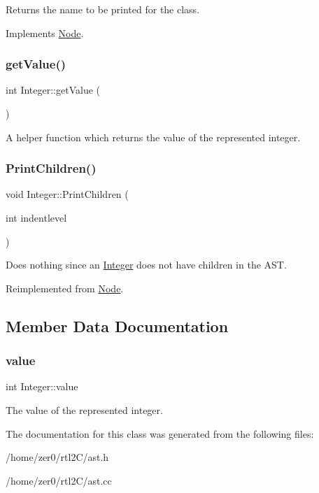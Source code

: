 Returns the name to be printed for the class. 

Implements \hyperlink{class_node_a56e29657306ffb004d69c6929ae44269}{Node}.

\mbox{\label{class_integer_aa3331a24fafb6e1c0fcf284ea9e88472}} 
\subsubsection{\texorpdfstring{get\+Value()}{getValue()}}
{\footnotesize\ttfamily int Integer\+::get\+Value (\begin{DoxyParamCaption}{ }\end{DoxyParamCaption})\hspace{0.3cm}{\ttfamily [inline]}}

A helper function which returns the value of the represented integer. \mbox{\label{class_integer_ac4122c2a26fe8825c4c3123f217a4021}} 
\subsubsection{\texorpdfstring{Print\+Children()}{PrintChildren()}}
{\footnotesize\ttfamily void Integer\+::\+Print\+Children (\begin{DoxyParamCaption}\item[{int}]{indentlevel }\end{DoxyParamCaption})\hspace{0.3cm}{\ttfamily [virtual]}}

Does nothing since an \hyperlink{class_integer}{Integer} does not have children in the A\+ST. 

Reimplemented from \hyperlink{class_node_a3e67ec8d22182b721717af14fe0c3000}{Node}.



\subsection{Member Data Documentation}
\mbox{\label{class_integer_a2ac4a32a4ba0682490bb55390a13749e}} 
\subsubsection{\texorpdfstring{value}{value}}
{\footnotesize\ttfamily int Integer\+::value\hspace{0.3cm}{\ttfamily [protected]}}

The value of the represented integer. 

The documentation for this class was generated from the following files\+:\begin{DoxyCompactItemize}
\item 
/home/zer0/rtl2\+C/ast.\+h\item 
/home/zer0/rtl2\+C/ast.\+cc\end{DoxyCompactItemize}
